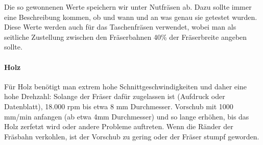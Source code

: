 \documentclass{\basedir/fablab-document}
\begin{document}
Die so gewonnenen Werte speichern wir unter Nutfräsen ab. Dazu sollte immer eine Beschreibung kommen, ob und wann und an was genau sie getestet wurden. Diese Werte werden auch für das Taschenfräsen verwendet, wobei man als seitliche Zustellung zwischen den Fräserbahnen 40\% der Fräserbreite angeben sollte.

\paragraph{Holz} Für Holz benötigt man extrem hohe Schnittgeschwindigkeiten und daher eine hohe Drehzahl: Solange der Fräser dafür zugelassen ist (Aufdruck oder Datenblatt), 18.000 rpm bis etwa 8 mm Durchmesser. Vorschub mit 1000 mm/min anfangen (ab etwa 4mm Durchmesser) und so lange erhöhen, bis das Holz zerfetzt wird oder andere Probleme auftreten. Wenn die Ränder der Fräsbahn verkohlen, ist der Vorschub zu gering oder der Fräser stumpf geworden.


\end{document}
